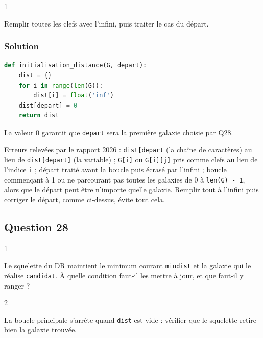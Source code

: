 \documentclass[11pt,a4paper]{article}
\begin{document}
\begin{indication}{1}

Remplir toutes les clefs avec l'infini, puis traiter le cas du départ.

\end{indication}

\hypertarget{solution-26}{%
\subsubsection{Solution}\label{solution-26}}

\begin{lstlisting}[language=Python]
def initialisation_distance(G, depart):
    dist = {}
    for i in range(len(G)):
        dist[i] = float('inf')
    dist[depart] = 0
    return dist
\end{lstlisting}

La valeur 0 garantit que \texttt{depart} sera la première galaxie choisie par Q28.

\begin{piege}

Erreurs relevées par le rapport 2026 : \texttt{dist{[}\textquotesingle{}depart\textquotesingle{}{]}} (la chaîne de caractères) au lieu de \texttt{dist{[}depart{]}} (la variable) ; \texttt{G{[}i{]}} ou \texttt{G{[}i{]}{[}j{]}} pris comme clefs au lieu de l'indice \texttt{i} ; départ traité avant la boucle puis écrasé par l'infini ; boucle commençant à 1 ou ne parcourant pas toutes les galaxies de 0 à \texttt{len(G)\ -\ 1}, alors que le départ peut être n'importe quelle galaxie. Remplir tout à l'infini puis corriger le départ, comme ci-dessus, évite tout cela.

\end{piege}

\hypertarget{question-28}{%
\subsection{Question 28}\label{question-28}}

\begin{indication}{1}

Le squelette du DR maintient le minimum courant \texttt{mindist} et la galaxie qui le réalise \texttt{candidat}. À quelle condition faut-il les mettre à jour, et que faut-il y ranger ?

\end{indication}

\begin{indication}{2}

La boucle principale s'arrête quand \texttt{dist} est vide : vérifier que le squelette retire bien la galaxie trouvée.

\end{indication}
\end{document}
